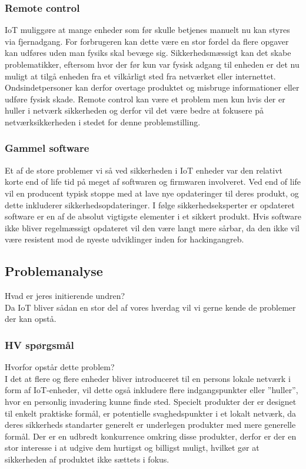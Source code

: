         
        \subsubsection{Remote control}
        IoT muliggøre at mange enheder som før skulle betjenes manuelt nu kan styres via fjernadgang. For forbrugeren kan dette være en stor fordel da flere opgaver kan udføres uden man fysiks skal bevæge sig. Sikkerhedsmæssigt kan det skabe problematikker, eftersom hvor der før kun var fysisk adgang til enheden er det nu muligt at tilgå enheden fra et vilkårligt sted fra netværket eller internettet.\\ Ondsindetpersoner kan derfor overtage produktet og misbruge informationer eller udføre fysisk skade. Remote control kan være et problem men kun hvis der er huller i netværk sikkerheden og derfor vil det være bedre at fokusere på netværksikkerheden i stedet for denne problemstilling.\autocite{}\\
        
        \subsubsection{Gammel software}
        Et af de store problemer vi så ved sikkerheden i IoT enheder var den relativt korte end of life tid på meget af softwaren og firmwaren involveret. Ved end of life vil en producent typisk stoppe med at lave nye opdateringer til deres produkt, og dette inkluderer sikkerhedsopdateringer. I følge sikkerhedseksperter er opdateret software er en af de absolut vigtigste elementer i et sikkert produkt. \autocite{soups2015} Hvis software ikke bliver regelmæssigt opdateret vil den være langt mere sårbar, da den ikke vil være resistent mod de nyeste udviklinger inden for hackingangreb.
        
    \subsection{Problemanalyse}
    Hvad er jeres initierende undren?\\
    Da IoT bliver sådan en stor del af vores hverdag vil vi gerne kende de problemer der kan opstå. \\
        
    
        
        \subsubsection{HV spørgsmål}
        Hvorfor opstår dette problem?\\
        I det at flere og flere enheder bliver introduceret til en persons lokale netværk i form af IoT-enheder, vil dette også inkludere flere indgangspunkter eller ”huller”, hvor en personlig invadering kunne finde sted. Specielt produkter der er designet til enkelt praktiske formål, er potentielle svaghedspunkter i et lokalt netværk, da deres sikkerheds standarter generelt er underlegen produkter med mere generelle formål. Der er en udbredt konkurrence omkring disse produkter, derfor er der en stor interesse i at udgive dem hurtigst og billigst muligt, hvilket gør at sikkerheden af produktet ikke sættets i fokus.\\

